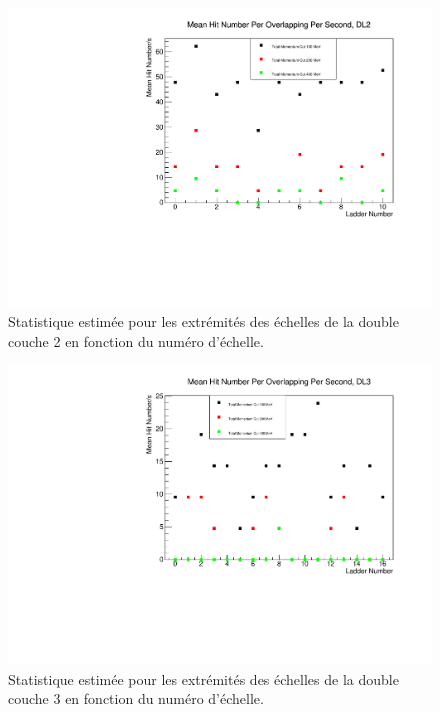    \begin{figure}[!ht]
    \begin{center}
      \includegraphics[scale=0.60]{./figures/MVs_Beamstrahlung/miniVectorsStudy/meanHitNumber_PerOr_PerSecond_DL2.pdf}
      \caption{Statistique estim\'ee pour les extr\'emit\'es des \'echelles de la double couche 2 en fonction du num\'ero d'\'echelle.}
      \label{fig:Statistic_DoubleLayer2}
    \end{center}
  \end{figure}

   \begin{figure}[!hb]
    \begin{center}
      \includegraphics[scale=0.60]{./figures/MVs_Beamstrahlung/miniVectorsStudy/meanHitNumber_PerOr_PerSecond_DL3.pdf}
      \caption{Statistique estim\'ee pour les extr\'emit\'es des \'echelles de la double couche 3 en fonction du num\'ero d'\'echelle.}
      \label{fig:Statistic_DoubleLayer3}
    \end{center}
  \end{figure}
  
